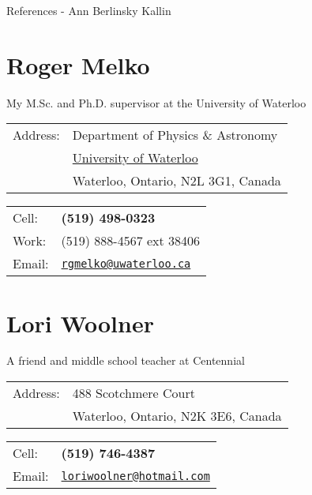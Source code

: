 \documentclass[letterpaper]{article}
\def\name{References - Ann Berlinsky Kallin}
\renewenvironment{itemize}{
  \begin{list}{}{
    \setlength{\leftmargin}{1.5em}
  }
}{
  \end{list}
}
\begin{document}
{\huge \name}


\vspace{0.25in}

\section*{Roger Melko}

\begin{itemize}
\item My M.Sc. and Ph.D. supervisor at the University of Waterloo
\end {itemize}

\begin{minipage}[t]{0.5\linewidth}
 \begin{tabular}{ll}
   Address: & Department of Physics \& Astronomy \\
  & \href{http://uwaterloo.ca/}{University of Waterloo} \\
  & Waterloo, Ontario, N2L 3G1, Canada
  \end{tabular}
\end{minipage}
\begin{minipage}[t]{0.45\linewidth}
  \begin{tabular}{ll}   
    Cell: &  \bf (519) 498-0323 \\
    Work: & (519) 888-4567 ext 38406 \\
    Email: & \href{mailto:rgmelko@uwaterloo.ca}{\tt rgmelko@uwaterloo.ca}
  \end{tabular}
\end{minipage}



\section*{Lori Woolner}

\begin{itemize}
\item A friend and middle school teacher at Centennial
\end{itemize}
	
	\begin{minipage}[t]{0.5\linewidth}
 \begin{tabular}{ll}
   Address: & 488 Scotchmere Court \\
  & Waterloo, Ontario, N2K 3E6, Canada
  \end{tabular}
\end{minipage}
\begin{minipage}[t]{0.45\linewidth}
  \begin{tabular}{ll}   
    Cell: &  \bf (519) 746-4387 \\
    Email: & \href{mailto:loriwoolner@hotmail.com}{\tt loriwoolner@hotmail.com}
  \end{tabular}
\end{minipage}
\end{document}
